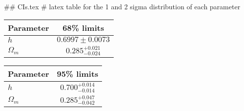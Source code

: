 ## CIs.tex
# latex table for the 1 and 2 sigma distribution of each parameter

\begin{tabular} { l  c}
 Parameter &  68\% limits\\
\hline
{\boldmath$h              $} & $0.6997\pm 0.0073          $\\
{\boldmath$\Omega_m       $} & $0.285^{+0.021}_{-0.024}   $\\
\hline
\end{tabular}

\begin{tabular} { l  c}
 Parameter &  95\% limits\\
\hline
{\boldmath$h              $} & $0.700^{+0.014}_{-0.014}   $\\
{\boldmath$\Omega_m       $} & $0.285^{+0.047}_{-0.042}   $\\
\hline
\end{tabular}
